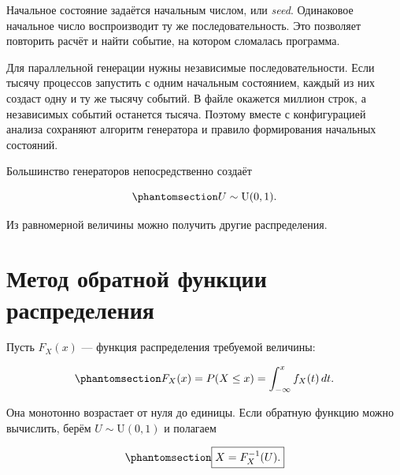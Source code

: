 \documentclass[
  russian,
  11pt,
  a4paper,
  open=any]{scrbook}
\begin{document}
Начальное состояние задаётся начальным числом, или \emph{seed}.
Одинаковое начальное число воспроизводит ту же последовательность. Это
позволяет повторить расчёт и найти событие, на котором сломалась
программа.

Для параллельной генерации нужны независимые последовательности. Если
тысячу процессов запустить с одним начальным состоянием, каждый из них
создаст одну и ту же тысячу событий. В файле окажется миллион строк, а
независимых событий останется тысяча. Поэтому вместе с конфигурацией
анализа сохраняют алгоритм генератора и правило формирования начальных
состояний.

Большинство генераторов непосредственно создаёт

\begin{equation}\protect\phantomsection\label{eq-ch8-base-uniform-distribution}{
U\sim\mathrm U(0,1).
}\end{equation}

Из равномерной величины можно получить другие распределения.

\section{Метод обратной функции
распределения}\label{ux43cux435ux442ux43eux434-ux43eux431ux440ux430ux442ux43dux43eux439-ux444ux443ux43dux43aux446ux438ux438-ux440ux430ux441ux43fux440ux435ux434ux435ux43bux435ux43dux438ux44f}

Пусть \(F_X(x)\) --- функция распределения требуемой величины:

\begin{equation}\protect\phantomsection\label{eq-ch8-cumulative-distribution}{
F_X(x)=P(X\leq x)
=\int_{-\infty}^{x}f_X(t)\,dt.
}\end{equation}

Она монотонно возрастает от нуля до единицы. Если обратную функцию можно
вычислить, берём \(U\sim\mathrm U(0,1)\) и полагаем

\begin{equation}\protect\phantomsection\label{eq-ch8-inverse-transform-sampling}{
\boxed{X=F_X^{-1}(U).}
}\end{equation}
\end{document}
